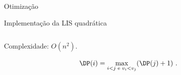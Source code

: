 \begin{frame}{Otimização}

    \begin{block}{Implementação da LIS quadrática}
        \footnotesize
        \inputminted{cpp}{codigos/lis.cpp}    
    \end{block}

    Complexidade: $O(n^2)$.

    \[ \DP(i) = \max_{i < j \text{ e } v_i < v_j}(\DP(j)+1) \ . \]



\end{frame}
